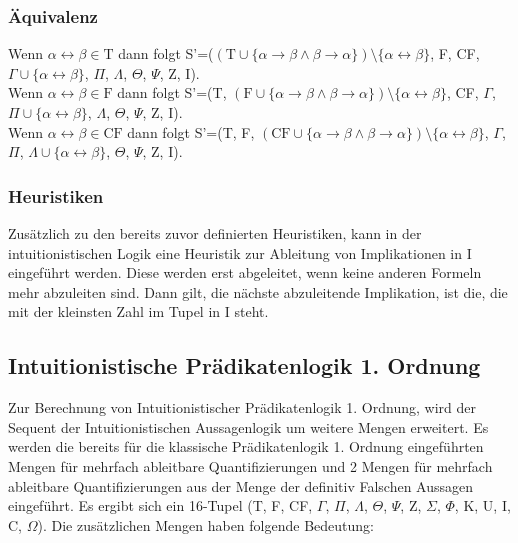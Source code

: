 \subsubsection{Äquivalenz}
Wenn $\alpha\leftrightarrow\beta\in\textrm{T}$ dann folgt S'=($(\textrm{T}\cup\lbrace\alpha\rightarrow\beta\wedge\beta\rightarrow\alpha\rbrace)\setminus\lbrace\alpha\leftrightarrow\beta\rbrace$, F, CF, $\Gamma\cup\lbrace\alpha\leftrightarrow\beta\rbrace$, $\Pi$, $\Lambda$, $\Theta$, $\Psi$, Z, I).\\
Wenn $\alpha\leftrightarrow\beta\in\textrm{F}$ dann folgt S'=(T, $(\textrm{F}\cup\lbrace\alpha\rightarrow\beta\wedge\beta\rightarrow\alpha\rbrace)\setminus\lbrace\alpha\leftrightarrow\beta\rbrace$, CF, $\Gamma$, $\Pi\cup\lbrace\alpha\leftrightarrow\beta\rbrace$, $\Lambda$, $\Theta$, $\Psi$, Z, I).\\
Wenn $\alpha\leftrightarrow\beta\in\textrm{CF}$ dann folgt S'=(T, F, $(\textrm{CF}\cup\lbrace\alpha\rightarrow\beta\wedge\beta\rightarrow\alpha\rbrace)\setminus\lbrace\alpha\leftrightarrow\beta\rbrace$, $\Gamma$, $\Pi$, $\Lambda\cup\lbrace\alpha\leftrightarrow\beta\rbrace$, $\Theta$, $\Psi$, Z, I).

\subsubsection{Heuristiken}
Zusätzlich zu den bereits zuvor definierten Heuristiken, kann in der intuitionistischen Logik eine Heuristik zur Ableitung von Implikationen in I eingeführt werden. Diese werden erst abgeleitet, wenn keine anderen Formeln mehr abzuleiten sind. Dann gilt, die nächste abzuleitende Implikation, ist die, die mit der kleinsten Zahl im Tupel in I steht.


\subsection{Intuitionistische Prädikatenlogik 1. Ordnung}
Zur Berechnung von Intuitionistischer Prädikatenlogik 1. Ordnung, wird der Sequent der Intuitionistischen Aussagenlogik um weitere Mengen erweitert. Es werden die bereits für die klassische Prädikatenlogik 1. Ordnung eingeführten Mengen für mehrfach ableitbare Quantifizierungen und 2 Mengen für mehrfach ableitbare Quantifizierungen aus der Menge der definitiv Falschen Aussagen eingeführt. Es ergibt sich ein 16-Tupel (T, F, CF, $\Gamma$, $\Pi$, $\Lambda$, $\Theta$, $\Psi$, Z, $\Sigma$, $\Phi$, K, U, I, C, $\Omega$). Die zusätzlichen Mengen haben folgende Bedeutung:

